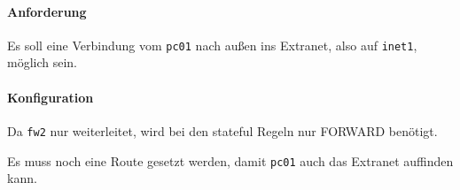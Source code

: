\paragraph{Anforderung} Es soll eine Verbindung vom {\tt pc01} nach
außen ins Extranet, also auf {\tt inet1}, möglich sein.


\paragraph{Konfiguration}

Da {\tt fw2} nur weiterleitet, wird bei den stateful
Regeln nur FORWARD benötigt.

Es muss noch eine Route gesetzt werden, damit {\tt pc01} auch das Extranet
auffinden kann.

